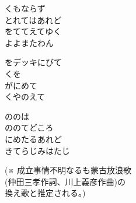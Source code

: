 ﻿\documentclass[10pt,a5j]{tarticle} %
\begin{document}
\begin{enumerate}
	\begin{minipage}[c]{\blocksize}
	
		\vspace{\linespace}
		\item
		くもならず\\
		とれてはあれど\\
		をててえてゆく\\
		よよまたわん\\
		
	\end{minipage}
	\begin{minipage}[c]{\blocksize}
	
		\vspace{\linespace}
		\item
		をデッキにびて\\
		くを\\
		がにめて\\
		くやのえて\\
	
	\end{minipage}
	\begin{minipage}[c]{\blocksize}
		
		\vspace{\linespace}
		\item
		ののは\\
		ののてどころ\\
		にめたるあれど\\
		きてらじみはたじ\\
	
	\end{minipage}
\end{enumerate}

\begin{flushright}
(※
成立事情不明なるも蒙古放浪歌\\
(仲田三孝作詞、川上義彦作曲)の\\
換え歌と推定される。)
\end{flushright}
\end{document}
